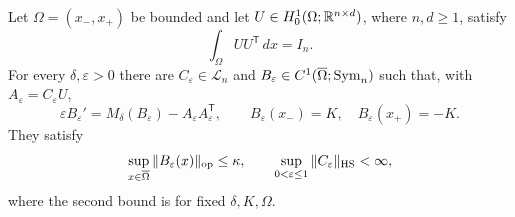 \begin{proposition}\label{path:connecting}
Let $\Omega=(x_-,x_+)$ be bounded and let
$U\in H^1_0(\Omega;\mathbb R^{n\times d})$, where $n,d\geq1$, satisfy
\[
                         \int_\Omega UU^{\mathsf T}\,dx=I_n.
\]
For every $\delta,\varepsilon>0$ there are
$C_\varepsilon\in\mathcal L_n$ and
$B_\varepsilon\in C^1(\overline\Omega;\operatorname{Sym}_n)$ such that, with
$A_\varepsilon=C_\varepsilon U$,
\begin{equation}\label{path:ode}
 \varepsilon B_\varepsilon'
       =M_\delta(B_\varepsilon)-A_\varepsilon A_\varepsilon^{\mathsf T},
 \qquad B_\varepsilon(x_-)=K,\quad B_\varepsilon(x_+)=-K.
\end{equation}
They satisfy
\begin{equation}\label{path:bounds}
 \sup_{x\in\overline\Omega}\|B_\varepsilon(x)\|_{\operatorname{op}}\leq\kappa,
 \qquad
 \sup_{0<\varepsilon\leq1}\|C_\varepsilon\|_{\mathrm{HS}}<\infty,
\end{equation}
where the second bound is for fixed $\delta,K,\Omega$.
\end{proposition}

